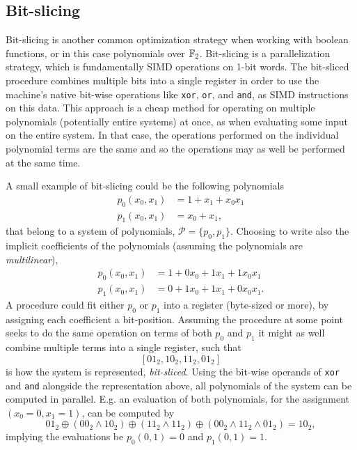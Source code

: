 \subsection{Bit-slicing}
Bit-slicing is another common optimization strategy when working with boolean functions, or in this case polynomials over $\mathbb{F}_2$. Bit-slicing is a parallelization strategy, which is fundamentally SIMD operations on 1-bit words. The bit-sliced procedure combines multiple bits into a single register in order to use the machine's native bit-wise operations like \texttt{xor}, \texttt{or}, and \texttt{and}, as SIMD instructions on this data. This approach is a cheap method for operating on multiple polynomials (potentially entire systems) at once, as when evaluating some input on the entire system. In that case, the operations performed on the individual polynomial terms are the same and so the operations may as well be performed at the same time.

A small example of bit-slicing could be the following polynomials
\begin{equation*}
    \begin{split}
        p_0(x_0, x_1) &= 1 + x_1 + x_0x_1\\
        p_1(x_0, x_1) &= x_0 + x_1,
    \end{split}
\end{equation*} 
that belong to a system of polynomials, $\mathcal{P} = \{p_0, p_1\}$. Choosing to write also the implicit coefficients of the polynomials (assuming the polynomials are \textit{multilinear}),
\begin{equation*}
    \begin{split}
        p_0(x_0, x_1) &= 1 + 0x_0 + 1x_1 + 1x_0x_1\\
        p_1(x_0, x_1) &= 0 + 1x_0 + 1x_1 + 0x_0x_1.
    \end{split}
\end{equation*} 
A procedure could fit either $p_0$ or $p_1$ into a register (byte-sized or more), by assigning each coefficient a bit-position. Assuming the procedure at some point seeks to do the same operation on terms of both $p_0$ and $p_1$ it might as well combine multiple terms into a single register, such that 
$$
    [01_2, 10_2, 11_2, 01_2]
$$
is how the system is represented, \textit{bit-sliced}. Using the bit-wise operands of \texttt{xor} and \texttt{and} alongside the representation above, all polynomials of the system can be computed in parallel. E.g. an evaluation of both polynomials, for the assignment $(x_0 = 0, x_1 = 1)$, can be computed by
\begin{equation*}
                01_2 \oplus (00_2 \wedge 10_2) \oplus (11_2 \wedge 11_2) \oplus (00_2 \wedge 11_2 \wedge 01_2) = 10_2,
\end{equation*}
implying the evaluations be $p_0(0,1) = 0$ and $p_1(0,1) = 1$.

